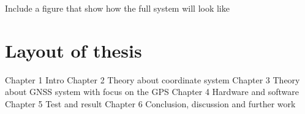 Include a figure that show how the full system will look like
\section{Layout of thesis}
Chapter 1 Intro
Chapter 2 Theory about coordinate system
Chapter 3 Theory about GNSS system with focus on the GPS
Chapter 4 Hardware and software
Chapter 5 Test and result
Chapter 6 Conclusion, discussion and further work


%
%
%
%
%
%
%
%
%
%
%
%
%
%
%
%
%
%
